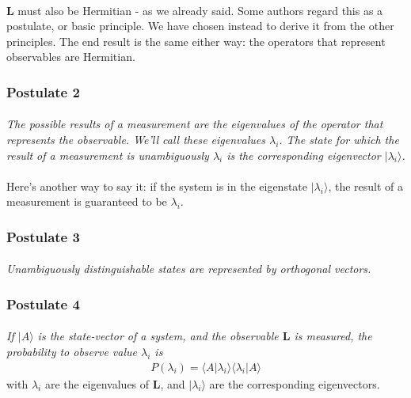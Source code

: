 \documentclass[a4paper,10pt]{article}
\begin{document}
\paragraph{} $\mathbf{L}$ must also be Hermitian - as we already said. Some authors regard this as a postulate, or basic principle. We have chosen instead to derive it from the other principles. The end result is the same either way: the operators that represent observables are Hermitian.

\subsubsection{Postulate 2}
\label{subsec:postulate2}
\paragraph{} \textit{The possible results of a measurement are the eigenvalues of the operator that represents the observable. We'll call these eigenvalues $\lambda_i$. The state for which the result of a measurement is unambiguously $\lambda_i$ is the corresponding eigenvector $|\lambda_i\rangle$.}

\paragraph{} Here's another way to say it: if the system is in the eigenstate $|\lambda_i\rangle$, the result of a measurement is guaranteed to be $\lambda_i$.

\subsubsection{Postulate 3}
\label{subsec:postulate3}
\paragraph{} \textit{Unambiguously distinguishable states are represented by orthogonal vectors.}

\subsubsection{Postulate 4}
\label{subsec:postulate4}
\paragraph{} \textit{If $|A\rangle$ is the state-vector of a system, and the observable $\mathbf{L}$ is measured, the probability to observe value $\lambda_i$ is}
\begin{equation}
\begin{aligned}
P(\lambda_i) = \langle A|\lambda_i\rangle\langle\lambda_i|A\rangle
\end{aligned}
\label{eq:postulate4}
\end{equation}
with $\lambda_i$ are the eigenvalues of $\mathbf{L}$, and $|\lambda_i\rangle$ are the corresponding eigenvectors.
\end{document}
